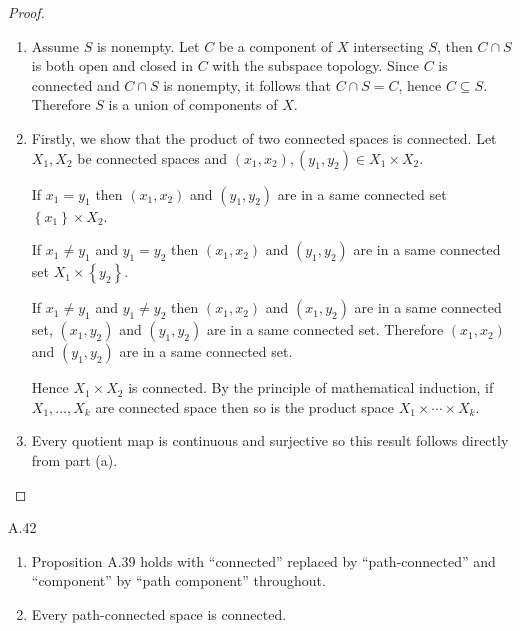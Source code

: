 \begin{proof}
\begin{enumerate}[itemsep=0pt,label={(\alph*)}]
              Thirdly, we show that every point belongs to a single component.

              Let's pick a point \( x_{0} \). The union of all connected subspaces of \( X \) containing \( x_{0} \) is connected, according to (b), and is a maximal connected set. Therefore \( x_{0} \) belongs to a component of \( X \). Due to the disjointness of components of \( X \), we conclude that \( x_{0} \) belongs to a single component.

              Thus the components of \( X \) are disjoint nonempty closed subsets whose union is \( X \).
        \item Assume \( S \) is nonempty. Let \( C \) be a component of \( X \) intersecting \( S \), then \( C \cap S \) is both open and closed in \( C \) with the subspace topology. Since \( C \) is connected and \( C \cap S \) is nonempty, it follows that \( C \cap S = C \), hence \( C \subseteq S \). Therefore \( S \) is a union of components of \( X \).
        \item Firstly, we show that the product of two connected spaces is connected. Let \( X_{1}, X_{2} \) be connected spaces and \( (x_{1}, x_{2}), (y_{1}, y_{2}) \in X_{1} \times X_{2} \).

              If \( x_{1} = y_{1} \) then \( (x_{1}, x_{2}) \) and \( (y_{1}, y_{2}) \) are in a same connected set \( \left\{ x_{1} \right\} \times X_{2} \).

              If \( x_{1} \ne y_{1} \) and \( y_{1} = y_{2} \) then \( (x_{1}, x_{2}) \) and \( (y_{1}, y_{2}) \) are in a same connected set \( X_{1} \times \left\{ y_{2} \right\} \).

              If \( x_{1} \ne y_{1} \) and \( y_{1} \ne y_{2} \) then \( (x_{1}, x_{2}) \) and \( (x_{1}, y_{2}) \) are in a same connected set, \( (x_{1}, y_{2}) \) and \( (y_{1}, y_{2}) \) are in a same connected set. Therefore \( (x_{1}, x_{2}) \) and \( (y_{1}, y_{2}) \) are in a same connected set.

              Hence \( X_{1} \times X_{2} \) is connected. By the principle of mathematical induction, if \( X_{1}, \ldots, X_{k} \) are connected space then so is the product space \( X_{1} \times \cdots \times X_{k} \).
        \item Every quotient map is continuous and surjective so this result follows directly from part (a).
    \end{enumerate}
\end{proof}

\begin{exercise}{A.42}
    \begin{enumerate}[itemsep=0pt,label={(\alph*)}]
        \item Proposition A.39 holds with ``connected'' replaced by ``path-connected'' and ``component'' by ``path component'' throughout.
        \item Every path-connected space is connected.
    \end{enumerate}
\end{exercise}

